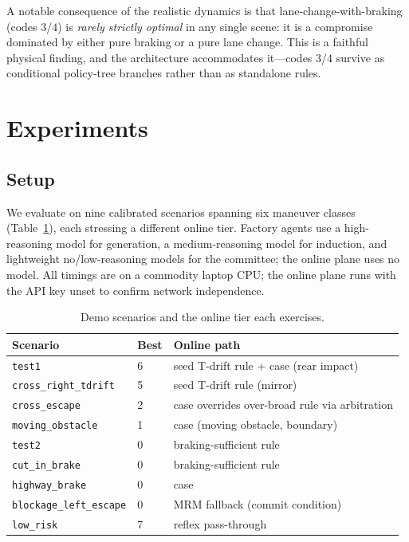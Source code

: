 \documentclass[conference]{IEEEtran}
\begin{document}
A notable consequence of the realistic dynamics is that
lane-change-with-braking (codes $3$/$4$) is \emph{rarely strictly optimal} in
any single scene: it is a compromise dominated by either pure braking or a
pure lane change. This is a faithful physical finding, and the architecture
accommodates it---codes $3$/$4$ survive as conditional policy-tree branches
rather than as standalone rules.

\section{Experiments}

\subsection{Setup}
We evaluate on nine calibrated scenarios spanning six maneuver classes
(Table~\ref{tab:scen}), each stressing a different online tier. Factory
agents use a high-reasoning model for generation, a medium-reasoning model
for induction, and lightweight no/low-reasoning models for the committee; the
online plane uses no model. All timings are on a commodity laptop CPU; the
online plane runs with the API key unset to confirm network independence.

\begin{table}[t]
\caption{Demo scenarios and the online tier each exercises.}
\label{tab:scen}
\centering
\begin{tabular}{@{}llp{3.2cm}@{}}
\toprule
Scenario & Best & Online path \\
\midrule
\texttt{test1} & 6 & seed T-drift rule + case (rear impact) \\
\texttt{cross\_right\_tdrift} & 5 & seed T-drift rule (mirror) \\
\texttt{cross\_escape} & 2 & case overrides over-broad rule via arbitration \\
\texttt{moving\_obstacle} & 1 & case (moving obstacle, boundary) \\
\texttt{test2} & 0 & braking-sufficient rule \\
\texttt{cut\_in\_brake} & 0 & braking-sufficient rule \\
\texttt{highway\_brake} & 0 & case \\
\texttt{blockage\_left\_escape} & 0 & MRM fallback (commit condition) \\
\texttt{low\_risk} & 7 & reflex pass-through \\
\bottomrule
\end{tabular}
\end{table}
\end{document}
